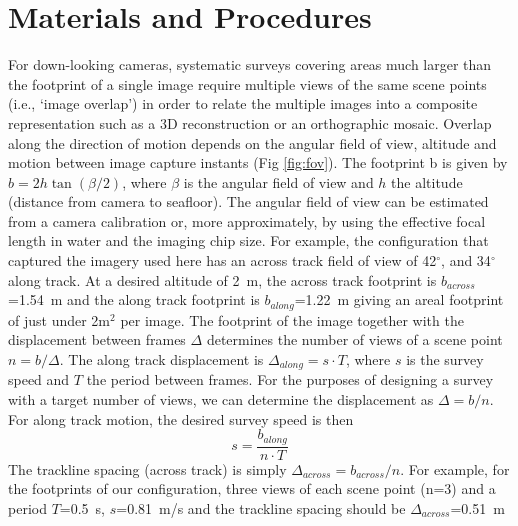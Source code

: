 \section{Materials and Procedures}
\label{sec:MandP}


For down-looking cameras, systematic surveys covering areas much larger than the footprint of a single image require multiple views of the same scene points (i.e., `image overlap') in order to relate the multiple images into a composite representation such as a 3D reconstruction or an orthographic mosaic. Overlap along the direction of motion depends on the angular field of view, altitude and motion between image capture instants (Fig \ref{fig:fov}). The footprint b is given by $b = 2 h \tan(\beta/2)$, where $\beta$ is the angular field of view and $h$ the altitude (distance from camera to seafloor). The angular field of view can be estimated from a camera calibration \cite{bouguet2004camera} or, more approximately, by using the effective focal length in water and the imaging chip size. For example, the configuration that captured the imagery used here has an across track field of view of 42$^\circ$, and 34$^\circ$ along track. At a desired altitude of 2~m, the across track footprint is $b_{across}$=1.54~m and the along track footprint is $b_{along}$=1.22~m giving an areal footprint of just under 2m$^2$ per image. 
The footprint of the image together with the displacement between frames $\Delta$ determines the number of views of a scene point $n = b/\Delta$. The along track displacement is $\Delta_{along} = s \cdot T$, where $s$ is the survey speed and $T$ the period between frames. 
For the purposes of designing a survey with a target number of views, we can determine the displacement as $\Delta = b/n$. For along track motion, the desired survey speed is then
\begin{equation}
s = \frac{b_{along}}{n \cdot T}
\end{equation}
The trackline spacing (across track) is simply $\Delta_{across} = b_{across}/n$.
For example, for the footprints of our configuration, three views of each scene point (n=3) and a period $T$=0.5~s, $s$=0.81~m/s and the trackline spacing should be $\Delta_{across}$=0.51~m


